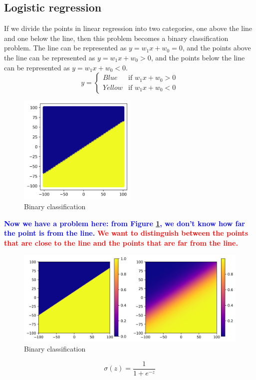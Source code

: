 \documentclass[oneside]{book}
\begin{document}
\subsection{Logistic regression}
If we divide the points in linear regression into two categories, one above the line and one below the line, then this problem becomes a binary classification problem.
The line can be represented as $y = w_1x + w_0 = 0$, and the points above the line can be represented as $y = w_1x + w_0 > 0$, and the points below the line can be represented as $y = w_1x + w_0 < 0$.
\begin{equation}
        y = \begin{cases}
                Blue  & \text{if } w_1x + w_0 > 0 \\
                Yellow & \text{if } w_1x + w_0 < 0
        \end{cases}
        \label{eq:binary1}
\end{equation}
\begin{figure}[H]
        \centering
        \includegraphics[width=0.5\textwidth]{images/binary class1.png}
        \caption{Binary classification}
        \label{fig:binary1}
\end{figure}

\textcolor{blue}{\textbf{Now we have a problem here: from Figure \ref{fig:binary1}, we don't know how far the point is from the line.}}
\textcolor{red}{\textbf{ We want to distinguish between the points that are close to the line and the points that are far from the line.}}
\begin{figure}[H]
        \centering
        \includegraphics[width=1.0\textwidth]{images/binaryclass2.png}
        \caption{Binary classification}
        \label{fig:binary2}
\end{figure}
\begin{equation}
        \sigma (z) = \frac{1}{1+e^{-z}}
        \label{eq:binary2}
\end{equation}
\end{document}
